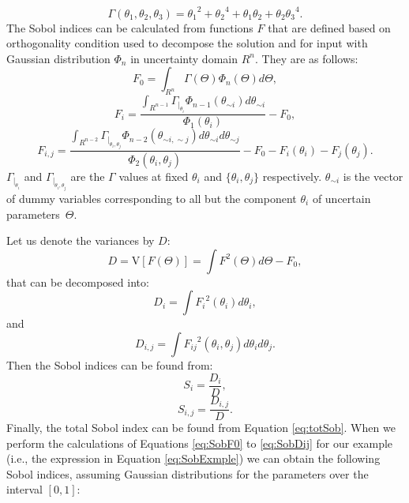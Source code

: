 \begin{equation}
\Gamma(\theta_1,\theta_2,\theta_3) =
{\theta_1}^2+{\theta_2}^4+{\theta_1}{\theta_2}+{\theta_2}{\theta_3}^4.
\label{eq:SobExmple}\end{equation} The Sobol indices can be calculated from
functions $F$ that are defined based on orthogonality condition used to
decompose the solution and for input with Gaussian distribution $\Phi_n$ in
uncertainty domain $R^n$. They are as follows:
\begin{equation}
F_0=\int_{R^n}\Gamma(\Theta) \Phi_n(\Theta) d\Theta,
\label{eq:SobF0}\end{equation}
\begin{equation}
F_i=\frac{\int_{R^{n-1}}\Gamma_{|_{\theta_i}}
\Phi_{n-1}(\theta_{\sim i}) d\theta_{\sim i}}{\Phi_{1}(\theta_i)} - F_0,
\label{eq:SobFi}\end{equation}
\begin{equation}
F_{i,j}=\frac{\int_{R^{n-2}}\Gamma_{|_{\theta_i,\theta_j}}
\Phi_{n-2}(\theta_{\sim i,\sim j}) d\theta_{\sim i} d\theta_{\sim
j}}{\Phi_{2}(\theta_i,\theta_j)}-F_0-F_i(\theta_i)-F_j(\theta_j).
\label{eq:SobFij}\end{equation} $\Gamma_{|_{\theta_i}}$ and
$\Gamma_{|_{\theta_i,\theta_j}}$ are the $\Gamma$ values at fixed $\theta_i$ and
$\{\theta_i,\theta_j\}$ respectively. $\theta_{\sim i}$ is the vector of dummy
variables corresponding to all but the component $\theta_i$ of uncertain
parameters~$\Theta$.

Let us denote the variances by $D$:
\begin{equation}
D=\mbox{V}[F(\Theta)]=\int F^2(\Theta) d\Theta-F_0,
\label{eq:SobD}\end{equation} that can be decomposed into: 
\begin{equation}
D_i=\int{F_i}^2(\theta_i) d\theta_i,
\label{eq:SobDi}\end{equation} and
\begin{equation} 
D_{i,j}=\int{F_{ij}}^2(\theta_{i},\theta_{j}) d\theta_{i}d\theta_{j}.
\label{eq:SobDij}\end{equation} Then the Sobol indices can be found from:
\begin{equation} 
S_i=\frac{D_i}{D},
\label{eq:SiDi}\end{equation}
\begin{equation} 
S_{i,j}=\frac{D_{i,j}}{D}.
\label{eq:SijDij}\end{equation} Finally, the total Sobol index can be found
from Equation \ref{eq:totSob}. When we perform the calculations of Equations
\ref{eq:SobF0} to \ref{eq:SobDij} for our example (i.e., the expression in
Equation \ref{eq:SobExmple}) we can obtain the following Sobol
indices,
assuming Gaussian distributions for the parameters over the interval $[0,1]$:

